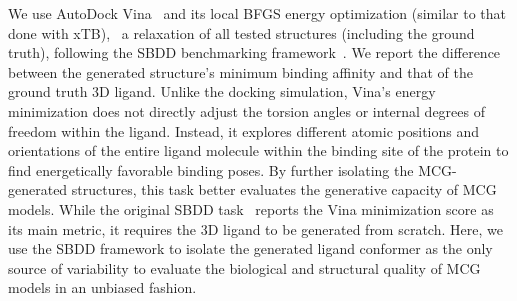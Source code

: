 We use AutoDock Vina~\citep{vina} and its local BFGS energy optimization (similar to that done with xTB), \ie\ a relaxation of all tested structures (including the ground truth), following the SBDD benchmarking framework~\cite{targetdiff}. We report the difference between the generated structure’s minimum binding affinity and that of the ground truth 3D ligand. 
Unlike the docking simulation, Vina's energy minimization does not directly adjust the torsion angles or internal degrees of freedom within the ligand. Instead, it explores different atomic positions and orientations of the entire ligand molecule within the binding site of the protein to find energetically favorable binding poses. 
By further isolating the MCG-generated structures, this task better evaluates the generative capacity of MCG models. %
While the original SBDD task~\citep{pocket2mol, targetdiff} reports the Vina minimization score as its main metric, it requires the 3D ligand to be generated from scratch. Here, we use the SBDD framework to isolate the generated ligand conformer as the only source of variability to evaluate the biological and structural quality of MCG models in an unbiased fashion. 

